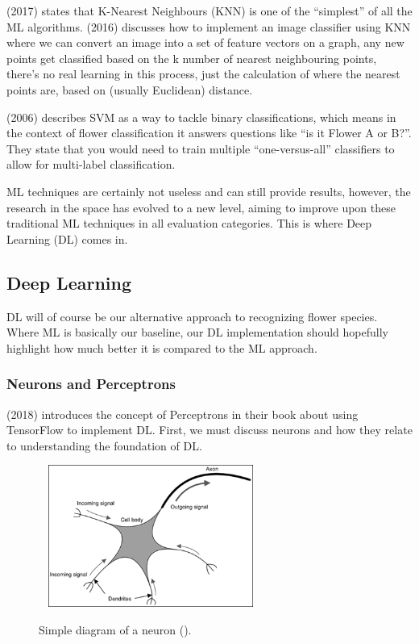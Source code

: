 \documentclass{article}
\begin{document}
\citeauthor{MohammedMohssen2017Ml:a} (2017) states that K-Nearest Neighbours (KNN) is one of the “simplest” of  all the 
ML algorithms. \citeauthor{rosebook2016} (2016) discusses how to implement an image classifier using KNN where we can 
convert an image into a set of feature vectors on a graph, any new points get classified based on the k number of 
nearest neighbouring points, there's no real learning in this process, just the calculation of where the nearest points 
are, based on (usually Euclidean) distance.

\par

\citeauthor{NobleWilliamS2006Wias} (2006) describes SVM as a way to tackle binary classifications, which means in the 
context of flower classification it answers questions like “is it Flower A or B?”. They state that you would need
to train multiple “one-versus-all” classifiers to allow for multi-label classification.

\par

ML techniques are certainly not useless and can still provide results, however, the research in the space has evolved 
to a new level, aiming to improve upon these traditional ML techniques in all evaluation categories. This is where Deep
Learning (DL) comes in.

\subsection{Deep Learning}

DL will of course be our alternative approach to recognizing flower species. Where ML is basically our baseline, our DL 
implementation should hopefully highlight how much better it is compared to the ML approach.

\subsubsection{Neurons and Perceptrons}

\citeauthor{ScarpinoMatthew2018Tfd} (2018) introduces the concept of Perceptrons in their book about using TensorFlow 
to implement DL. First, we must discuss neurons and how they relate to understanding the foundation of DL.

\begin{figure}[h]\
    \centering
    \includegraphics[width=0.6\textwidth]{neuron.png}
    \caption{Simple diagram of a neuron (\cite{ScarpinoMatthew2018Tfd}).}
\end{figure}
\end{document}
